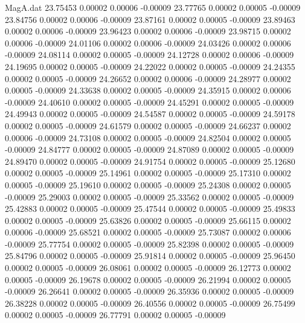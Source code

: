 \begin{filecontents}{MagA.dat}
  23.75453    0.00002    0.00006   -0.00009
  23.77765    0.00002    0.00005   -0.00009
  23.84756    0.00002    0.00006   -0.00009
  23.87161    0.00002    0.00005   -0.00009
  23.89463    0.00002    0.00006   -0.00009
  23.96423    0.00002    0.00006   -0.00009
  23.98715    0.00002    0.00006   -0.00009
  24.01106    0.00002    0.00006   -0.00009
  24.03426    0.00002    0.00006   -0.00009
  24.08114    0.00002    0.00005   -0.00009
  24.12728    0.00002    0.00006   -0.00009
  24.19695    0.00002    0.00005   -0.00009
  24.22022    0.00002    0.00005   -0.00009
  24.24355    0.00002    0.00005   -0.00009
  24.26652    0.00002    0.00006   -0.00009
  24.28977    0.00002    0.00005   -0.00009
  24.33638    0.00002    0.00005   -0.00009
  24.35915    0.00002    0.00006   -0.00009
  24.40610    0.00002    0.00005   -0.00009
  24.45291    0.00002    0.00005   -0.00009
  24.49943    0.00002    0.00005   -0.00009
  24.54587    0.00002    0.00005   -0.00009
  24.59178    0.00002    0.00005   -0.00009
  24.61579    0.00002    0.00005   -0.00009
  24.66237    0.00002    0.00006   -0.00009
  24.73108    0.00002    0.00005   -0.00009
  24.82504    0.00002    0.00005   -0.00009
  24.84777    0.00002    0.00005   -0.00009
  24.87089    0.00002    0.00005   -0.00009
  24.89470    0.00002    0.00005   -0.00009
  24.91754    0.00002    0.00005   -0.00009
  25.12680    0.00002    0.00005   -0.00009
  25.14961    0.00002    0.00005   -0.00009
  25.17310    0.00002    0.00005   -0.00009
  25.19610    0.00002    0.00005   -0.00009
  25.24308    0.00002    0.00005   -0.00009
  25.29003    0.00002    0.00005   -0.00009
  25.33562    0.00002    0.00005   -0.00009
  25.42883    0.00002    0.00005   -0.00009
  25.47544    0.00002    0.00005   -0.00009
  25.49833    0.00002    0.00005   -0.00009
  25.63826    0.00002    0.00005   -0.00009
  25.66115    0.00002    0.00006   -0.00009
  25.68521    0.00002    0.00005   -0.00009
  25.73087    0.00002    0.00006   -0.00009
  25.77754    0.00002    0.00005   -0.00009
  25.82398    0.00002    0.00005   -0.00009
  25.84796    0.00002    0.00005   -0.00009
  25.91814    0.00002    0.00005   -0.00009
  25.96450    0.00002    0.00005   -0.00009
  26.08061    0.00002    0.00005   -0.00009
  26.12773    0.00002    0.00005   -0.00009
  26.19678    0.00002    0.00005   -0.00009
  26.21994    0.00002    0.00005   -0.00009
  26.26641    0.00002    0.00005   -0.00009
  26.35936    0.00002    0.00005   -0.00009
  26.38228    0.00002    0.00005   -0.00009
  26.40556    0.00002    0.00005   -0.00009
  26.75499    0.00002    0.00005   -0.00009
  26.77791    0.00002    0.00005   -0.00009

\end{filecontents}
